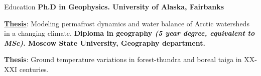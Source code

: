 \begin{rubric}{Education}
\entry*[2013 -- 2020]
	\textbf{Ph.D in Geophysics. University of Alaska, Fairbanks}
\par{\href{https://www.proquest.com/dissertations-theses/modeling-permafrost-dynamics-water-balance-arctic/docview/2474920630/se-2}{\textbf{Thesis}}: Modeling permafrost dynamics and water balance of Arctic watersheds in a changing climate.}
\entry*[2008 -- 2013]%
	\textbf{Diploma in geography \textit{(5 year degree, equivalent to MSc)}. Moscow State University, Geography department.}
    
\par{\textbf{Thesis}: Ground temperature variations in forest-thundra and boreal taiga in XX-XXI centuries.}\par
	
%
\end{rubric}